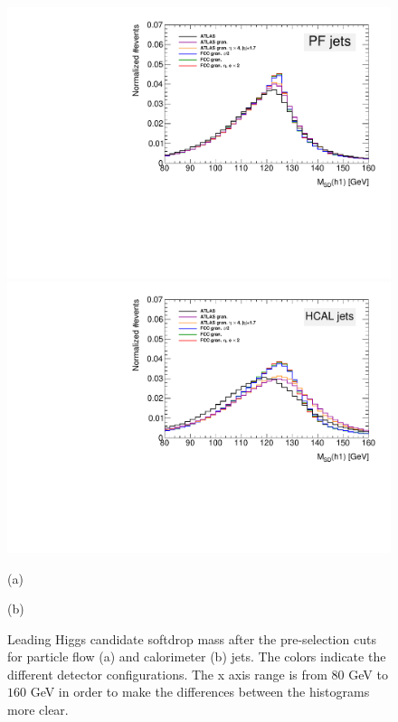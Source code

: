\begin{figure}
	\centering
	\begin{minipage}[t]{.5\textwidth}
		\centering
		\includegraphics[trim={.55cm 0 0 0},clip,width=\linewidth]{./Figures/M.pdf}
		
	\end{minipage}%
	\begin{minipage}[t]{.5\textwidth}
		\centering
		\includegraphics[trim={0 0 .55cm 0},clip,width=\linewidth]{./Figures/MCALO.pdf}
	\end{minipage}
	
	\begin{minipage}[t]{0.5\textwidth}
		\caption*{(a)}
		\label{fig:CompGran_M}
	\end{minipage}%
	\hfill
	\begin{minipage}[t]{0.5\textwidth}
		\caption*{(b)}
	\end{minipage}
	\caption{Leading Higgs candidate softdrop mass after the pre-selection cuts for particle flow (a) and calorimeter (b) jets. The colors indicate the different detector configurations. The x axis range is from $80$ GeV to $160$ GeV in order to make the differences between the histograms more clear.}
	\label{fig:CompGran}
\end{figure}

